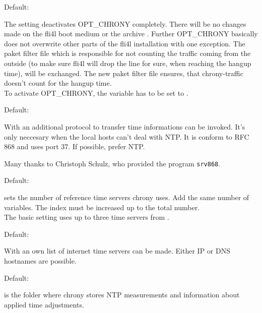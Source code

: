 \begin{description}


  Default: 

  The setting  deactivates OPT\_CHRONY completely. There will be no changes
  made on the fli4l boot medium or the archive .
  Further OPT\_CHRONY basically does not overwrite other parts of the fli4l installation
  with one exception. The paket filter file which is responsible for not counting the 
  traffic coming from the outside (to make sure fli4l will drop the line for sure, 
  when reaching the hangup time), will be exchanged. The new paket filter file ensures, 
  that chrony-traffic doesn't count for the hangup time.\\
  To activate OPT\_CHRONY, the variable  has to be set to . 

  

  Default: 

  With  an additional protocol to transfer time informations
  can be invoked. It's only neccesary when the local hosts can't deal with NTP. It is
  conform to RFC 868 and uses port 37. If possible, prefer NTP.

  Many thanks to Christoph Schulz, who provided the program \texttt{srv868}.



  Default: 

   sets the number of reference time servers chrony uses.
  Add the same number of  variables. The index  
  must be increased up to the total number.\\
  The basic setting uses up to three time servers from
  .
  


  Default: 
  
  With  an own list of internet time servers can be
  made. Either IP or DNS hostnames are possible.


  Default: 

   is the folder where chrony stores NTP measurements and
  information about applied time adjustments.

\end{description}
  
